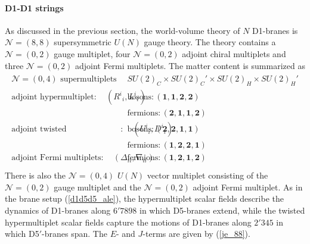 \documentclass{article}
\numberwithin{equation}{section}
\begin{document}
\paragraph{D1-D1 strings}
As discussed in the previous section, 
the world-volume theory of $N$ D1-branes is $\mathcal{N}=(8,8)$ supersymmetric $U(N)$ gauge theory. 
The theory contains a $\mathcal{N}=(0,2)$ gauge multiplet, 
four $\mathcal{N}=(0,2)$ adjoint chiral multiplets and three $\mathcal{N}=(0,2)$ adjoint Fermi multiplets. 
The matter content is summarized as 
\begin{align}
\label{d1d5b_modes}
\begin{array}{c|c}
\textrm{$\mathcal{N}=(0,4)$ supermultiplets}& SU(2)_{C}\times SU(2)_{C}'\times SU(2)_{H}\times SU(2)_{H}' \\ \hline 
\textrm{adjoint hypermultiplet}:\quad ({R^{i}}_{i}, {L^{i}}_{i}) 
&\textrm{bosons}: (\bm{1}, \bm{1},\bm{2},\bm{2}) \\ 
&\textrm{fermions}: (\bm{2},\bm{1},\bm{1},\bm{2}) \\ \hline
\textrm{adjoint twisted hypermultiplet}:\quad ({U^{i}}_{i}, {D^{i}}_{i})
&\textrm{bosons}: (\bm{2}, \bm{2},\bm{1},\bm{1}) \\ 
&\textrm{fermions}: (\bm{1},\bm{2},\bm{2},\bm{1}) \\ \hline
\textrm{adjoint Fermi multiplets}:\quad (\Delta_{ii}, \nabla_{ii}) 
&\textrm{fermions}: (\bm{1},\bm{2},\bm{1},\bm{2}) \\ 
\end{array}
\end{align}
There is also the $\mathcal{N}=(0,4)$ $U(N)$ vector multiplet 
consisting of the $\mathcal{N}=(0,2)$ gauge multiplet and the $\mathcal{N}=(0,2)$ adjoint Fermi multiplet. 
As in the brane setup (\ref{d1d5d5_ale}), 
the hypermultiplet scalar fields describe the dynamics of D1-branes 
along $6'7898$ in which D5-branes extend, 
while the twisted hypermultiplet scalar fields 
capture the motions of D1-branes along $2'345$ in which D5$'$-branes span. 
The $E$- and $J$-terms are given by (\ref{je_88}). 
\end{document}
